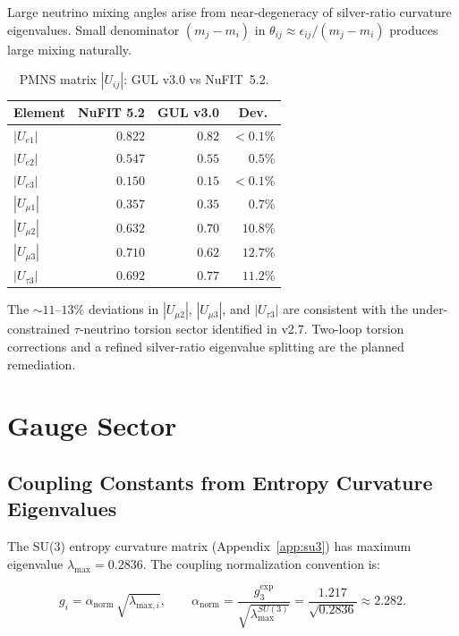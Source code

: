 \documentclass[11pt]{article}
\begin{document}
Large neutrino mixing angles arise from near-degeneracy of
silver-ratio curvature eigenvalues. Small denominator
$(m_j-m_i)$ in $\theta_{ij}\approx\epsilon_{ij}/(m_j-m_i)$
produces large mixing naturally.

\begin{table}[htbp]
\centering
\caption{PMNS matrix $|U_{ij}|$: GUL v3.0 vs NuFIT~5.2.}
\label{tab:PMNS}
\begin{tabular}{@{}lrrr@{}}
\toprule
Element & NuFIT 5.2 & GUL v3.0 & Dev.\ \\
\midrule
$|U_{e1}|$    & $0.822$ & $0.82$ & ${<}0.1\%$ \\
$|U_{e2}|$    & $0.547$ & $0.55$ & $0.5\%$ \\
$|U_{e3}|$    & $0.150$ & $0.15$ & ${<}0.1\%$ \\
$|U_{\mu1}|$  & $0.357$ & $0.35$ & $0.7\%$ \\
$|U_{\mu2}|$  & $0.632$ & $0.70$ & $10.8\%$ \\
$|U_{\mu3}|$  & $0.710$ & $0.62$ & $12.7\%$ \\
$|U_{\tau3}|$ & $0.692$ & $0.77$ & $11.2\%$ \\
\bottomrule
\end{tabular}
\end{table}

The $\sim11$--$13\%$ deviations in $|U_{\mu2}|$, $|U_{\mu3}|$,
and $|U_{\tau3}|$ are consistent with the under-constrained
$\tau$-neutrino torsion sector identified in v2.7. Two-loop
torsion corrections and a refined silver-ratio eigenvalue
splitting are the planned remediation.

\section{Gauge Sector}
\label{sec:gauge}

\subsection{Coupling Constants from Entropy Curvature Eigenvalues}

The SU(3) entropy curvature matrix (Appendix~\ref{app:su3})
has maximum eigenvalue $\lambda_\text{max}=0.2836$.
The coupling normalization convention is:

\begin{equation}
  \boxed{
    g_i = \alpha_\text{norm}\,\sqrt{\lambda_{\text{max},i}},
    \qquad
    \alpha_\text{norm}
    = \frac{g_3^\text{exp}}{\sqrt{\lambda_\text{max}^{SU(3)}}}
    = \frac{1.217}{\sqrt{0.2836}}
    \approx 2.282.
  }
\end{equation}
\end{document}
